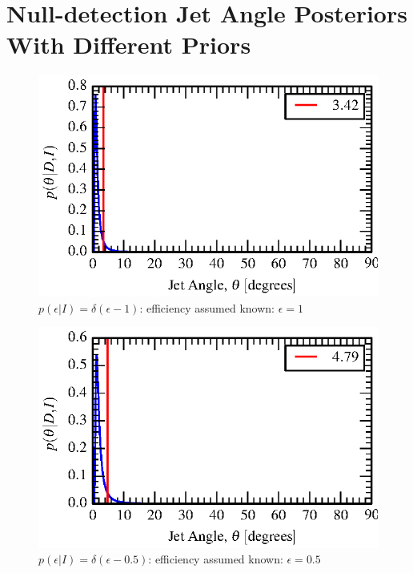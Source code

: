 \documentclass[nofootinbib]{revtex4}
\begin{document}
\section{Null-detection Jet Angle Posteriors With Different Priors}
\begin{figure}[h!]
\includegraphics{jet_angle_posterior_s6UL_TEST_deltaEffPrior-1.0.eps}
\caption{$p(\epsilon|I)=\delta(\epsilon-1)$: efficiency assumed known:
$\epsilon=1$}
\end{figure}

\begin{figure}[h!]
\includegraphics{jet_angle_posterior_s6UL_TEST_deltaEffPrior-0.5.eps}
\caption{$p(\epsilon|I)=\delta(\epsilon-0.5)$: efficiency assumed known:
$\epsilon=0.5$}
\end{figure}
\end{document}
